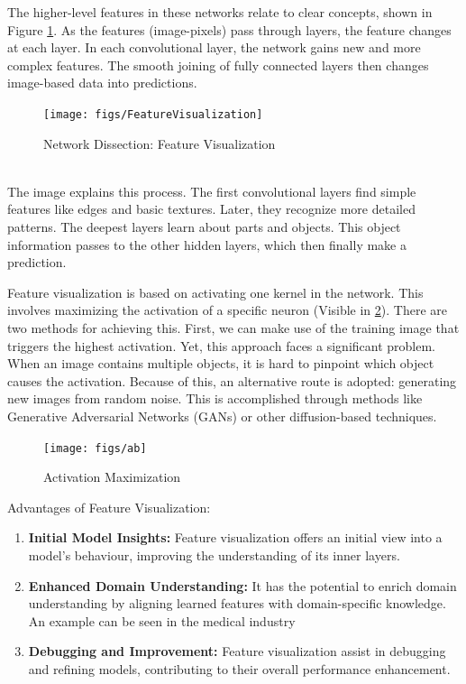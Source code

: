 The higher-level features in these networks relate to clear concepts, shown in Figure \ref{fig:feature-visualization}. As the features (image-pixels) pass through layers, the feature changes at each layer. In each convolutional layer, the network gains new and more complex features. The smooth joining of fully connected layers then changes image-based data into predictions.
\\
\begin{figure}[h!]
	\centering
	\texttt{[image: figs/FeatureVisualization]}
	\caption[Network Dissection: Feature Visualization]{Network Dissection: Feature Visualization \cite{olah2017feature}}
	\label{fig:feature-visualization}
\end{figure}
\\
The image explains this process. The first convolutional layers find simple features like edges and basic textures. Later, they recognize more detailed patterns. The deepest layers learn about parts and objects. This object information passes to the other hidden layers, which then finally make a prediction.

Feature visualization is based on activating one kernel in the network. This involves maximizing the activation of a specific neuron (Visible in \ref*{fig:optimization}). There are two methods for achieving this. First, we can make use of the training image that triggers the highest activation. Yet, this approach faces a significant problem. When an image contains multiple objects, it is hard to pinpoint which object causes the activation. Because of this, an alternative route is adopted: generating new images from random noise. This is accomplished through methods like Generative Adversarial Networks (GANs) or other diffusion-based techniques.

\begin{figure}[h!]
	\centering
	\texttt{[image: figs/ab]}
	\caption[Activation Maximization]{Activation Maximization \cite{olah2017feature}}
	\label{fig:optimization}
\end{figure}

Advantages of Feature Visualization:
\begin{enumerate}
	\item \textbf{Initial Model Insights:} Feature visualization offers an initial view into a model's behaviour, improving the understanding of its inner layers.
	\item \textbf{Enhanced Domain Understanding:} It has the potential to enrich domain understanding by aligning learned features with domain-specific knowledge. An example can be seen in the medical industry
	\item \textbf{Debugging and Improvement:} Feature visualization assist in debugging and refining models, contributing to their overall performance enhancement.
\end{enumerate}

